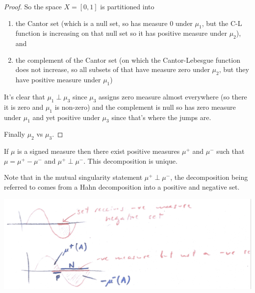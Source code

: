 \begin{example}
\begin{proof}
    So the space $X = [0, 1]$ is partitioned into
    \begin{enumerate}
    \item the Cantor set (which is a null set, so has measure $0$ under $\mu_1$, but the C-L
      function is increasing on that null set so it has positive measure under $\mu_2$), and
    \item the complement of the Cantor set (on which the Cantor-Lebesgue function does not
      increase, so all subsets of that have measure zero under $\mu_2$, but they have positive
      measure under $\mu_1$)
    \end{enumerate}
    It's clear that $\mu_1 \perp \mu_3$ since $\mu_3$ assigns zero measure almost everywhere (so
    there it is zero and $\mu_1$ is non-zero) and the complement is null so has zero measure
    under $\mu_1$ and yet positive under $\mu_3$ since that's where the jumps are.

    Finally $\mu_2$ vs $\mu_3$.

  \end{proof}

\end{example}

\begin{theorem}
  If $\mu$ is a signed measure then there exist positive measures $\mu^+$ and $\mu^-$ such
  that $\mu = \mu^+ - \mu^-$ and $\mu^+ \perp \mu^-$. This decomposition is unique.
\end{theorem}

\begin{intuition}
  Note that in the mutual singularity statement $\mu^+ \perp \mu^-$, the decomposition being
  referred to comes from a Hahn decomposition into a positive and negative set.
\end{intuition}

\begin{mdframed}
\includegraphics[width=400pt]{img/analysis--berkeley-202a--billingsley-section-1--12-signed-measures-b561.png}
\end{mdframed}

